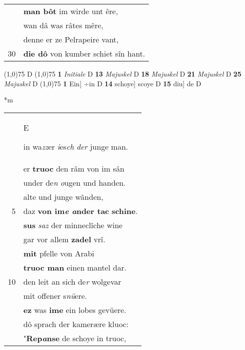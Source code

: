 \documentclass[8pt,a4paper,notitlepage]{article}
\begin{document}
\begin{table}[ht]
\begin{minipage}[t]{0.5\linewidth}
\begin{tabular}{rl}
 & \textbf{man bôt} im wirde unt êre,\\ 
 & wan dâ was râtes mêre,\\ 
 & denne er ze Pelrapeire vant,\\ 
30 & \textbf{die dô} von kumber schiet sîn hant.\\ 
\end{tabular}
\scriptsize
\line(1,0){75} \newline
D \newline
\line(1,0){75} \newline
\textbf{1} \textit{Initiale} D  \textbf{13} \textit{Majuskel} D  \textbf{18} \textit{Majuskel} D  \textbf{21} \textit{Majuskel} D  \textbf{25} \textit{Majuskel} D  \newline
\line(1,0){75} \newline
\textbf{1} Ein] ÷in D \textbf{14} schoye] scoye D \textbf{15} diu] de D \newline
\end{minipage}
\hspace{0.5cm}
\begin{minipage}[t]{0.5\linewidth}
\small
\begin{center}*m
\end{center}
\begin{tabular}{rl}
 & \begin{large}E\end{large}in wa\textit{zz}er \textit{i}es\textit{ch} \textit{der} junge man.\\ 
 & er \textbf{truoc} den râm von im sân\\ 
 & under de\textit{n} \textit{o}ugen und handen.\\ 
 & alte und junge wânden,\\ 
5 & daz \textbf{von im\textit{e} \textit{a}nder tac} \textbf{schine}.\\ 
 & \textbf{sus} \textit{saz} der minneclîche wine\\ 
 & gar vor allem \textbf{zadel} vrî.\\ 
 & \textbf{mit} pfelle von Arabi\\ 
 & \textbf{truoc man} einen mantel dar.\\ 
10 & den leit an sich de\textit{r} wolgevar\\ 
 & mit offener s\textit{nü}ere.\\ 
 & \textbf{ez} was \textbf{ime} ein lobes gevüere.\\ 
 & dô sprach der kamerære kluoc:\\ 
 & "\textbf{Rep\textit{a}nse} de schoye in truoc,\\ 

\end{tabular}
\end{minipage}
\end{table}
\end{document}
